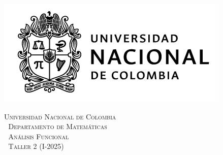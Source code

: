 \thispagestyle{empty}

\begin{minipage}{0.3\textwidth}
  \includegraphics[scale=0.35]{logounal.png}
\end{minipage}%
\hfill
\begin{minipage}{0.65\textwidth}
  \begin{center}
    \scshape
    \Large \textsc{Universidad Nacional de Colombia} \\
    \textcolor{white}{\tiny.} \Large \textsc{Departamento de Matemáticas} \\
    \textcolor{white}{\tiny.} \large \textsc{Análisis Funcional} \\
    \textcolor{white}{\tiny.} \large \textsf{Taller 2} \normalsize (I-2025)
  \end{center}
\end{minipage}

\vspace{0.3cm}
\normalfont

